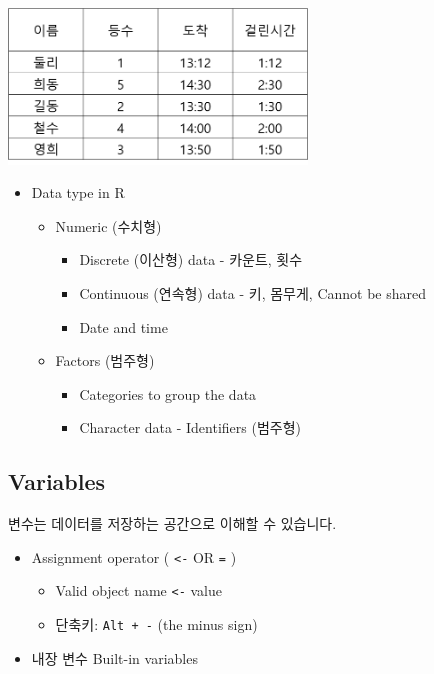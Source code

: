 \documentclass[
]{book}
\providecommand{\tightlist}{%
  \setlength{\itemsep}{0pt}\setlength{\parskip}{0pt}}
\begin{document}
\includegraphics[width=3.125in,height=\textheight]{images/02/01.png}

\begin{itemize}
\tightlist
\item
  Data type in R

  \begin{itemize}
  \tightlist
  \item
    Numeric (수치형)

    \begin{itemize}
    \tightlist
    \item
      Discrete (이산형) data - 카운트, 횟수
    \item
      Continuous (연속형) data - 키, 몸무게, Cannot be shared
    \item
      Date and time
    \end{itemize}
  \item
    Factors (범주형)

    \begin{itemize}
    \tightlist
    \item
      Categories to group the data
    \item
      Character data - Identifiers (범주형)
    \end{itemize}
  \end{itemize}
\end{itemize}

\hypertarget{variables}{%
\subsection{Variables}\label{variables}}

변수는 데이터를 저장하는 공간으로 이해할 수 있습니다.

\begin{itemize}
\tightlist
\item
  Assignment operator ( \texttt{\textless{}-} OR \texttt{=} )

  \begin{itemize}
  \tightlist
  \item
    Valid object name \texttt{\textless{}-} value
  \item
    단축키: \texttt{Alt\ +\ -} (the minus sign)
  \end{itemize}
\item
  내장 변수 Built-in variables
\end{itemize}
\end{document}
